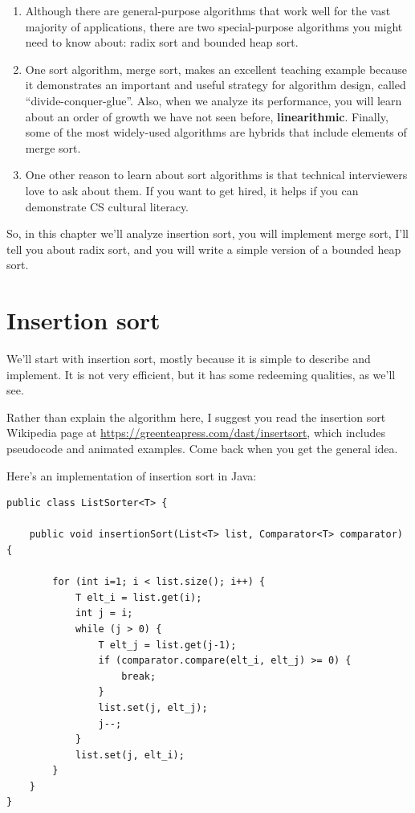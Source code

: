 \documentclass[12pt]{book}
\theoremstyle{exercise}
\begin{document}
\begin{enumerate}

\item
  Although there are general-purpose algorithms that work well for the
  vast majority of applications, there are two special-purpose
  algorithms you might need to know about: radix sort and bounded heap
  sort.

\item
  One sort algorithm, merge sort, makes an excellent teaching example
  because it demonstrates an important and useful strategy for
  algorithm design, called ``divide-conquer-glue''. Also, when we
  analyze its performance, you will learn about an order of growth we
  have not seen before, {\bf linearithmic}. Finally, some of the most
  widely-used algorithms are hybrids that include elements of merge
  sort.

\item
  One other reason to learn about sort algorithms is that technical
  interviewers love to ask about them. If you want to get hired, it
  helps if you can demonstrate CS cultural literacy.

\end{enumerate}

So, in this chapter we'll analyze insertion sort, you will implement merge
sort, I'll tell you about radix sort, and you will write a simple
version of a bounded heap sort.



\section{Insertion sort}
\label{insertion-sort}

We'll start with insertion sort, mostly because it is simple to describe
and implement. It is not very efficient, but it has some redeeming
qualities, as we'll see.


Rather than explain the algorithm here, I suggest you read the
insertion sort Wikipedia page at
\url{https://greenteapress.com/dast/insertsort}, which includes
pseudocode and animated examples. Come back when you get the general
idea.

Here's an implementation of insertion sort in Java:

\begin{verbatim}
public class ListSorter<T> {

    public void insertionSort(List<T> list, Comparator<T> comparator) {

        for (int i=1; i < list.size(); i++) {
            T elt_i = list.get(i);
            int j = i;
            while (j > 0) {
                T elt_j = list.get(j-1);
                if (comparator.compare(elt_i, elt_j) >= 0) {
                    break;
                }
                list.set(j, elt_j);
                j--;
            }
            list.set(j, elt_i);
        }
    }
}
\end{verbatim}
\end{document}
